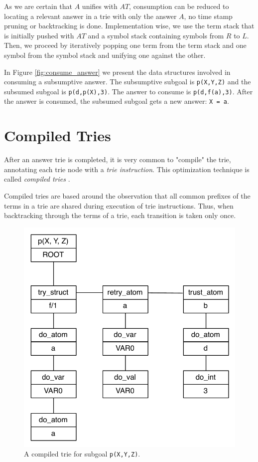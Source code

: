 As we are certain that $A$ unifies with $AT$, consumption can be reduced to locating a relevant
answer in a trie with only the answer $A$, no time stamp pruning or backtracking is done.
Implementation wise, we use the term stack that is initially pushed with $AT$
and a symbol stack containing symbols from $R$ to $L$. Then, we proceed by
iteratively popping one term from the term stack and one symbol from the symbol stack
and unifying one against the other.

In Figure \ref{fig:consume_answer} we present the data structures involved in consuming
a subsumptive answer. The subsumptive subgoal is \texttt{p(X,Y,Z)} and the
subsumed subgoal is \texttt{p(d,p(X),3)}. The answer to consume is \texttt{p(d,f(a),3)}.
After the answer is consumed, the subsumed subgoal gets a new answer: \texttt{X = a}.

\section{Compiled Tries}

After an answer trie is completed, it is very common to "compile" the trie,
annotating each trie node with a \textit{trie instruction}. This optimization technique
is called \textit{compiled tries} \cite{RamakrishnanIV-99}.

Compiled tries are based around the observation that all common prefixes of the terms in a trie
are shared during execution of trie instructions. Thus, when backtracking
through the terms of a trie, each transition is taken only once.

\begin{figure}[H]
  \centering
    \includegraphics[scale=0.6]{compiled_trie.pdf}
  \caption{A compiled trie for subgoal \texttt{p(X,Y,Z)}.}
  \label{fig:compiled_trie}
\end{figure}

